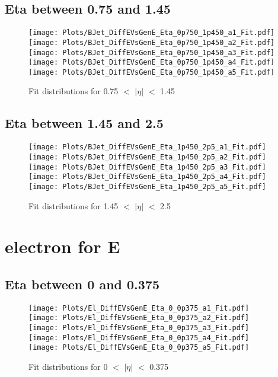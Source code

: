 \documentclass[a4paper,10pt]{article}
\begin{document}
 \subsection{Eta between 0.75 and 1.45}
 \begin{figure}[h!b] 
  \texttt{[image: Plots/BJet\_DiffEVsGenE\_Eta\_0p750\_1p450\_a1\_Fit.pdf]} 
  \texttt{[image: Plots/BJet\_DiffEVsGenE\_Eta\_0p750\_1p450\_a2\_Fit.pdf]} \\ 
  \texttt{[image: Plots/BJet\_DiffEVsGenE\_Eta\_0p750\_1p450\_a3\_Fit.pdf]} 
  \texttt{[image: Plots/BJet\_DiffEVsGenE\_Eta\_0p750\_1p450\_a4\_Fit.pdf]} \\ 
  \texttt{[image: Plots/BJet\_DiffEVsGenE\_Eta\_0p750\_1p450\_a5\_Fit.pdf]} 
 \caption{Fit distributions for 0.75 $<$ $\vert \eta \vert$ $<$ 1.45}
 \end{figure}
 \newpage 
 \subsection{Eta between 1.45 and 2.5}
 \begin{figure}[h!b] 
  \texttt{[image: Plots/BJet\_DiffEVsGenE\_Eta\_1p450\_2p5\_a1\_Fit.pdf]} 
  \texttt{[image: Plots/BJet\_DiffEVsGenE\_Eta\_1p450\_2p5\_a2\_Fit.pdf]} \\ 
  \texttt{[image: Plots/BJet\_DiffEVsGenE\_Eta\_1p450\_2p5\_a3\_Fit.pdf]} 
  \texttt{[image: Plots/BJet\_DiffEVsGenE\_Eta\_1p450\_2p5\_a4\_Fit.pdf]} \\ 
  \texttt{[image: Plots/BJet\_DiffEVsGenE\_Eta\_1p450\_2p5\_a5\_Fit.pdf]} 
 \caption{Fit distributions for 1.45 $<$ $\vert \eta \vert$ $<$ 2.5}
\end{figure} 

\newpage 
\section{electron for E}
 \subsection{Eta between 0 and 0.375}
 \begin{figure}[h!b] 
  \texttt{[image: Plots/El\_DiffEVsGenE\_Eta\_0\_0p375\_a1\_Fit.pdf]} 
  \texttt{[image: Plots/El\_DiffEVsGenE\_Eta\_0\_0p375\_a2\_Fit.pdf]} \\ 
  \texttt{[image: Plots/El\_DiffEVsGenE\_Eta\_0\_0p375\_a3\_Fit.pdf]} 
  \texttt{[image: Plots/El\_DiffEVsGenE\_Eta\_0\_0p375\_a4\_Fit.pdf]} \\ 
  \texttt{[image: Plots/El\_DiffEVsGenE\_Eta\_0\_0p375\_a5\_Fit.pdf]} 
 \caption{Fit distributions for 0 $<$ $\vert \eta \vert$ $<$ 0.375}
 \end{figure}
 \newpage 
\end{document}
